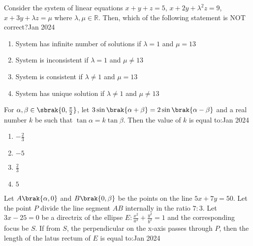\iffalse
   \title{Assignment}
   \author{EE24BTECH11034}
   \section{mcq-single}
\fi 

    \item Consider the system of linear equations
    $x + y + z = 5$, $x + 2y + \lambda^{2}z = 9$,
    $x + 3y + \lambda z = \mu$ where $\lambda, \mu \in \mathbb{R}$. Then, which of
    the following statement is NOT correct?\hfill{Jan 2024}
        
        \begin{enumerate}
        \item System has infinite number of solutions if $\lambda = 1$
        and $\mu = 13$
        \item System is inconsistent if $\lambda = 1$ and $\mu \ne 13$
        \item System is consistent if $\lambda \ne 1$ and $\mu = 13$
        \item System has unique solution if $\lambda \ne 1$ and $\mu \ne 13$
        \end{enumerate}

    \item For $\alpha,\beta\in\sbrak{0,\frac{\pi}{2}}$, let $3\sin\brak{\alpha+\beta}=2\sin\brak{\alpha-\beta}$ and a real number $k$ be such that $\tan\alpha=k\tan\beta$. Then the value of $k$ is equal to:\hfill{Jan 2024}

        \begin{multicols}{4}
        \begin{enumerate}
        \item $-\frac{2}{3}$
        \item $-5$
        \item $\frac{2}{3}$
        \item $5$
        \end{enumerate}
        \end{multicols}

    \item Let $A\brak{\alpha,0}$ and $B\brak{0,\beta}$ be the points on the line $5x+7y=50$. Let the point $P$ divide the line segment $AB$ internally in the ratio $7:3$. Let $3x-25=0$ be a directrix of the ellipse $E:\frac{x^{2}}{a^{2}}+\frac{y^{2}}{b^{2}}=1$ and the corresponding focus be $S$. If from $S$, the perpendicular on the x-axis passes through $P$, then the length of the latus rectum of $E$ is equal to:\hfill{Jan 2024}

